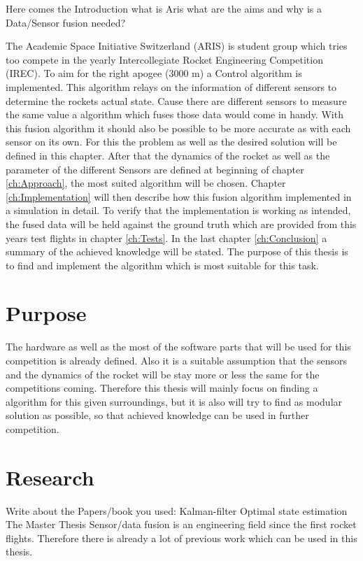 

 Here comes the Introduction what is Aris what are the aims and why is a Data/Sensor fusion needed? 
 
 The Academic Space Initiative Switzerland (ARIS) is student group which tries too compete in the yearly Intercollegiate Rocket Engineering Competition (IREC).
 To aim for the right apogee (3000 m) a Control algorithm is implemented. This algorithm relays on the information of different sensors to determine the rockets actual state.
 Cause there are different sensors to measure the same value a algorithm which fuses those data would come in handy.
 With this fusion algorithm it should also be possible to be more accurate as with each sensor on its own.
 For this the problem as well as the desired solution will be defined in this chapter.
 After that the dynamics of the rocket as well as the parameter of the different Sensors are defined at beginning of chapter \ref{ch:Approach}, the most suited algorithm will be chosen.
 Chapter \ref{ch:Implementation} will then describe how this fusion algorithm implemented in a simulation in detail.
 To verify that the implementation is working as intended, the fused data will be held against the ground truth which are provided from this years test flights in chapter \ref{ch:Tests}.
 In the last chapter \ref{ch:Conclusion} a summary of the achieved knowledge will be stated.
 The purpose of this thesis is to find and implement the algorithm which is most suitable for this task.
 
 \section{Purpose}
 The hardware as well as the most of the software parts that will be used for this competition is already defined.
 Also it is a suitable assumption that the sensors and the dynamics of the rocket will be stay more or less the same for the competitions coming.
 Therefore this thesis will mainly focus on finding a algorithm for this given surroundings, but it is also will try to find as modular solution as possible, so that achieved knowledge can be used in further competition.
  
 \section{Research}
 Write about the Papers/book you used:
 Kalman-filter
 Optimal state estimation
 The Master Thesis
 Sensor/data fusion is an engineering field since the first rocket flights. Therefore there is already a lot of previous work which can be used in this thesis.
 
